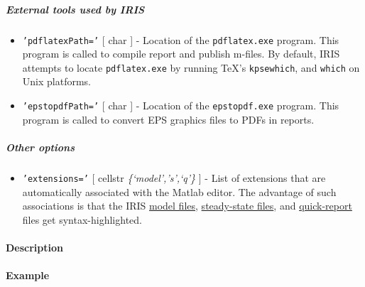  \subparagraph{External tools used by IRIS}
 
 \begin{itemize}
 \item
   \texttt{'pdflatexPath='} {[} char {]} - Location of the
   \texttt{pdflatex.exe} program. This program is called to compile
   report and publish m-files. By default, IRIS attempts to locate
   \texttt{pdflatex.exe} by running TeX's \texttt{kpsewhich}, and
   \texttt{which} on Unix platforms.
 \item
   \texttt{'epstopdfPath='} {[} char {]} - Location of the
   \texttt{epstopdf.exe} program. This program is called to convert EPS
   graphics files to PDFs in reports.
 \end{itemize}
 
 \subparagraph{Other options}
 
 \begin{itemize}
 \item
   \texttt{'extensions='} {[} cellstr \textbar{}
   \emph{\{`model','s',`q'\}} {]} - List of extensions that are
   automatically associated with the Matlab editor. The advantage of such
   associations is that the IRIS \href{modellang/Contents}{model files},
   \href{sstatelang/Contents}{steady-state files}, and
   \href{qreport/Contents}{quick-report} files get syntax-highlighted.
 \end{itemize}
 
 \paragraph{Description}
 
 \paragraph{Example}


